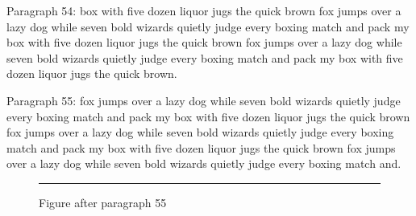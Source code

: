\documentclass[twocolumn]{article}
\begin{document}
Paragraph 54: box with five dozen liquor jugs the quick brown fox jumps over a lazy dog while seven bold wizards quietly judge every boxing match and pack my box with five dozen liquor jugs the quick brown fox jumps over a lazy dog while seven bold wizards quietly judge every boxing match and pack my box with five dozen liquor jugs the quick brown.

Paragraph 55: fox jumps over a lazy dog while seven bold wizards quietly judge every boxing match and pack my box with five dozen liquor jugs the quick brown fox jumps over a lazy dog while seven bold wizards quietly judge every boxing match and pack my box with five dozen liquor jugs the quick brown fox jumps over a lazy dog while seven bold wizards quietly judge every boxing match and.

\begin{figure}[tbp]\centering\rule{0.8\columnwidth}{8em}\caption{Figure after paragraph 55}\end{figure}
\end{document}
